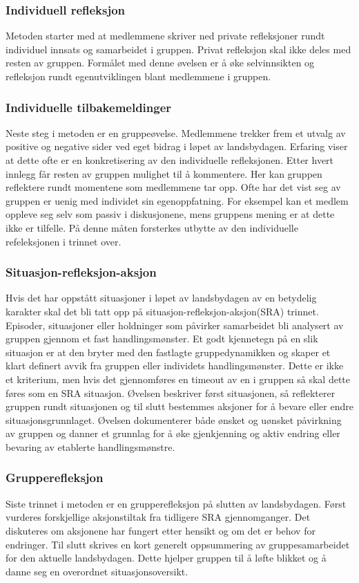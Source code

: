 \subsubsection{Individuell refleksjon}
Metoden starter med at medlemmene skriver ned private refleksjoner rundt individuel innsats og samarbeidet i gruppen. Privat refleksjon skal ikke deles med resten av gruppen. Formålet med denne øvelsen er å øke selvinnsikten og refleksjon rundt egenutviklingen blant medlemmene i gruppen.

\subsubsection{Individuelle tilbakemeldinger}
Neste steg i metoden er en gruppeøvelse. Medlemmene trekker frem et utvalg av positive og negative sider ved eget bidrag i løpet av landsbydagen. Erfaring viser at dette ofte er en konkretisering av den individuelle refleksjonen. Etter hvert innlegg får resten av gruppen mulighet til å kommentere. Her kan gruppen reflektere rundt momentene som medlemmene tar opp. Ofte har det vist seg av gruppen er uenig med individet sin egenoppfatning. For eksempel kan et medlem oppleve seg selv som passiv i diskusjonene, mens gruppens mening er at dette ikke er tilfelle. På denne måten forsterkes utbytte av den individuelle refeleksjonen i trinnet over.

\subsubsection{Situasjon-refleksjon-aksjon}
Hvis det har oppstått situasjoner i løpet av landsbydagen av en betydelig karakter skal det bli tatt opp på situasjon-refleksjon-aksjon(SRA) trinnet. Episoder, situasjoner eller holdninger som påvirker samarbeidet bli analysert av gruppen gjennom et fast handlingsmønster. Et godt kjennetegn på en slik situasjon er at den bryter med den fastlagte gruppedynamikken og skaper et klart definert avvik fra gruppen eller individets handlingsmønster. Dette er ikke et kriterium, men hvis det gjennomføres en timeout av en i gruppen så skal dette føres som en SRA situasjon. Øvelsen beskriver først situasjonen, så reflekterer gruppen rundt situasjonen og til slutt bestemmes aksjoner for å bevare eller endre situasjonsgrunnlaget. Øvelsen dokumenterer både ønsket og uønsket påvirkning av gruppen og danner et grunnlag for å øke gjenkjenning og aktiv endring eller bevaring av etablerte handlingsmønstre.

\subsubsection{Grupperefleksjon}
Siste trinnet i metoden er en grupperefleksjon på slutten av landsbydagen. Først vurderes forskjellige aksjonstiltak fra tidligere SRA gjennomganger. Det diskuteres om aksjonene har fungert etter hensikt og om det er behov for endringer. Til slutt skrives en kort generelt oppsummering av gruppesamarbeidet for den aktuelle landsbydagen. Dette hjelper gruppen til å løfte blikket og å danne seg en overordnet situasjonsoversikt.
